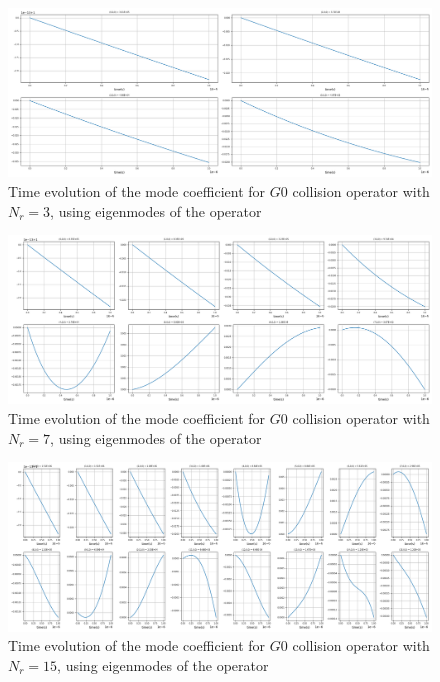 \documentclass{article}
\begin{document}
\begin{figure}[!tbhp]
	\includegraphics[width=\textwidth]{fig/g0_Nr_3_coeff_vs_time_1.00E+00_NI_1.00E+18_N0_3.22E+22_NE_1.00E+18.png}
	\caption{Time evolution of the mode coefficient for $G0$ collision operator with $N_r=3$, using eigenmodes of the operator\label{fig:g0_nr3}}
\end{figure}

\begin{figure}[!tbhp]
	\includegraphics[width=\textwidth]{fig/g0_Nr_7_coeff_vs_time_1.00E+00_NI_1.00E+18_N0_3.22E+22_NE_1.00E+18.png}
	\caption{Time evolution of the mode coefficient for $G0$ collision operator with $N_r=7$, using eigenmodes of the operator\label{fig:g0_nr7}}
\end{figure}

\begin{figure}[!tbhp]
	\includegraphics[width=\textwidth]{fig/g0_Nr_15_coeff_vs_time_1.00E+00_NI_1.00E+18_N0_3.22E+22_NE_1.00E+18.png}
	\caption{Time evolution of the mode coefficient for $G0$ collision operator with $N_r=15$, using eigenmodes of the operator\label{fig:g0_nr15}}
\end{figure}
\end{document}
